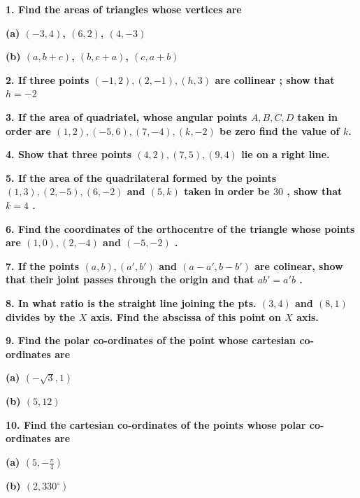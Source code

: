 \documentclass{article}
\begin{document}
\begin{flushleft}
\textbf{1. Find the areas of triangles whose vertices are}\par
\textbf{(a) $(-3, 4)$, $(6, 2)$, $(4, -3)$}\par
\textbf{(b) $(a, b+c)$, $(b, c+a)$, $(c, a+b)$}\par
\vspace{0.4cm}
\textbf{2. If three points $(-1, 2), (2, -1),(h,3)$ are collinear ; show that $h=-2$}\par
\vspace{0.4cm}
\textbf{3. If the area of quadriatel, whose angular points $A, B, C, D$ taken in order are $(1,2),(-5,6),(7,-4),(k,-2)$ be zero find the value of $k$.}\par
\vspace{0.4cm}
\textbf{4. Show that three points $(4,2),(7,5),(9,4)$ lie on a right line.}\par
\vspace{0.4cm}
\textbf{5. If the area of the quadrilateral formed by the points $(1,3),(2,-5),(6,-2)$ and $(5,k)$ taken in order be $30$ , show that $k=4$ . }\par
\vspace{0.4cm}
\textbf{6. Find the coordinates of the orthocentre of the triangle whose points are $(1,0),(2,-4)$ and $(-5,-2)$ .}\par
\vspace{0.4cm}
\textbf{7. If the points $(a,b),(a',b')$ and $(a-a' , b-b')$ are colinear, show that their joint passes through the origin and that $ab'=a'b$ .}\par
\vspace{0.4cm}
\textbf{8. In what ratio is the straight line joining the pts. $(3,4)$ and $(8,1)$ divides by the $X$ axis. Find the abscissa of this point on $X$ axis.}\par
\vspace{0.4cm}
\textbf{9. Find the polar co-ordinates of the point whose cartesian co-ordinates are}\par
\textbf{(a) $(-\sqrt{3},1)$  }\par
\textbf{(b) $(5,12)$}\par
\vspace{0.4cm}
\textbf{10. Find the cartesian co-ordinates of the points whose polar co-ordinates are}\par
\textbf{(a) $(5, -\frac{\pi}{4})$}\par
\textbf{(b) $(2, 330^{\circ})$}\par
\vspace{0.4cm}

\end{flushleft}
\end{document}
